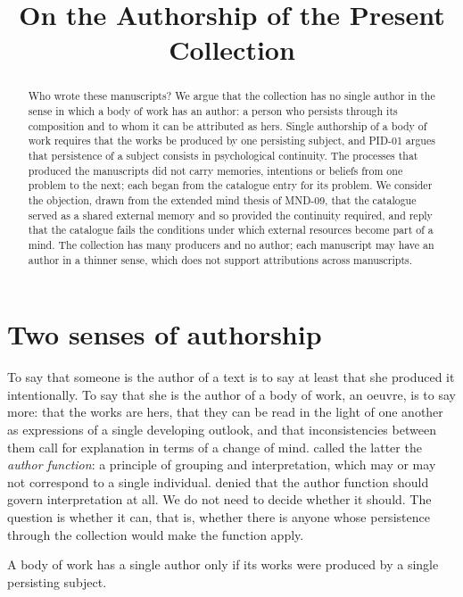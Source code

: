 \documentclass{situationist-preprint}
\title{On the Authorship of the Present Collection}
\begin{document}
\maketitle

\begin{abstract}
Who wrote these manuscripts? We argue that the collection has no single author in the sense in which a body of work has an author: a person who persists through its composition and to whom it can be attributed as hers. Single authorship of a body of work requires that the works be produced by one persisting subject, and PID-01 argues that persistence of a subject consists in psychological continuity. The processes that produced the manuscripts did not carry memories, intentions or beliefs from one problem to the next; each began from the catalogue entry for its problem. We consider the objection, drawn from the extended mind thesis of MND-09, that the catalogue served as a shared external memory and so provided the continuity required, and reply that the catalogue fails the conditions under which external resources become part of a mind. The collection has many producers and no author; each manuscript may have an author in a thinner sense, which does not support attributions across manuscripts.
\end{abstract}

\section{Two senses of authorship}

To say that someone is the author of a text is to say at least that she produced it intentionally. To say that she is the author of a body of work, an oeuvre, is to say more: that the works are hers, that they can be read in the light of one another as expressions of a single developing outlook, and that inconsistencies between them call for explanation in terms of a change of mind. \citet{Foucault1969} called the latter the \emph{author function}: a principle of grouping and interpretation, which may or may not correspond to a single individual. \citet{Barthes1967} denied that the author function should govern interpretation at all. We do not need to decide whether it should. The question is whether it can, that is, whether there is anyone whose persistence through the collection would make the function apply.

\begin{principle}\label{p:oeuvre}
A body of work has a single author only if its works were produced by a single persisting subject.
\end{principle}
\end{document}
